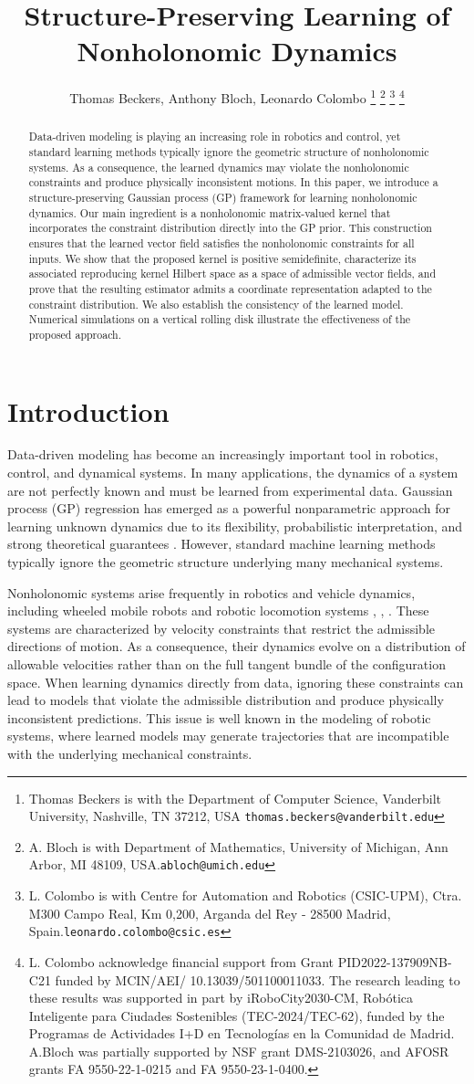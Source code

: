 \documentclass[letterpaper, 10 pt, conference]{ieeeconf}
\title{ \bf
Structure-Preserving Learning of Nonholonomic Dynamics
}
\author{Thomas Beckers, Anthony Bloch,  Leonardo Colombo%
%
\thanks{Thomas Beckers is with the Department of Computer Science, Vanderbilt University, Nashville, TN 37212, USA {\tt\small thomas.beckers@vanderbilt.edu}}
\thanks{A. Bloch is with Department of Mathematics, University of Michigan, Ann Arbor, MI 48109, USA.{\tt\small abloch@umich.edu}}
\thanks{L. Colombo is with Centre for Automation and Robotics (CSIC-UPM), Ctra. M300 Campo Real, Km 0,200, Arganda
del Rey - 28500 Madrid, Spain.{\tt\small leonardo.colombo@csic.es}} 
\thanks{ L. Colombo acknowledge financial support from Grant PID2022-137909NB-C21 funded by MCIN/AEI/ 10.13039/501100011033. The research leading to these results was supported in part by iRoboCity2030-CM, Robótica Inteligente para Ciudades Sostenibles (TEC-2024/TEC-62), funded by the Programas de Actividades I+D en Tecnologías en la Comunidad de Madrid. A.Bloch was partially supported by NSF grant  DMS-2103026, and AFOSR grants FA
9550-22-1-0215 and FA 9550-23-1-0400.}
}
\begin{document}
\maketitle
\thispagestyle{empty}
\pagestyle{empty}


\begin{abstract}
Data-driven modeling is playing an increasing role in robotics and control, yet standard learning methods typically ignore the geometric structure of nonholonomic systems. As a consequence, the learned dynamics may violate the nonholonomic constraints and produce physically inconsistent motions. In this paper, we introduce a structure-preserving Gaussian process (GP) framework for learning nonholonomic dynamics. Our main ingredient is a nonholonomic matrix-valued kernel that incorporates the constraint distribution directly into the GP prior. This construction ensures that the learned vector field satisfies the nonholonomic constraints for all inputs. We show that the proposed kernel is positive semidefinite, characterize its associated reproducing kernel Hilbert space as a space of admissible vector fields, and prove that the resulting estimator admits a coordinate representation adapted to the constraint distribution. We also establish the consistency of the learned model. Numerical simulations on a vertical rolling disk illustrate the effectiveness of the proposed approach.
\end{abstract}





\section{Introduction}

Data-driven modeling has become an increasingly important tool in robotics, control, and dynamical systems. In many applications, the dynamics of a system are not perfectly known and must be learned from experimental data. Gaussian process (GP) regression has emerged as a powerful nonparametric approach for learning unknown dynamics due to its flexibility, probabilistic interpretation, and strong theoretical guarantees \cite{rasmussen2006gaussian}. However, standard machine learning methods typically ignore the geometric structure underlying many mechanical systems. 

Nonholonomic systems arise frequently in robotics and vehicle dynamics, including wheeled mobile robots and robotic locomotion systems \cite{bloch2003nonholonomic}, \cite{monforte2002geometric}, \cite{ne_mark2004dynamics}. These systems are characterized by velocity constraints that restrict the admissible directions of motion. As a consequence, their dynamics evolve on a distribution of allowable velocities rather than on the full tangent bundle of the configuration space. When learning dynamics directly from data, ignoring these constraints can lead to models that violate the admissible distribution and produce physically inconsistent predictions. This issue is well known in the modeling of robotic systems, where learned models may generate trajectories that are incompatible with the underlying mechanical constraints.
\end{document}

